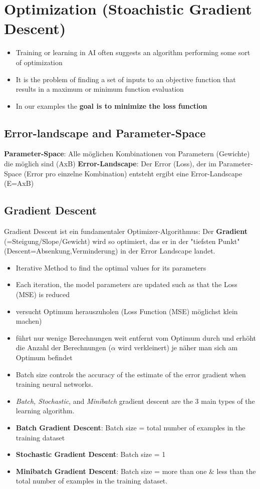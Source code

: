 \section{Optimization (Stoachistic Gradient Descent)}
\begin{itemize}
    \item Training or learning in AI often suggests an algorithm performing some sort of optimization
    \item It is the problem of finding a set of inputs to an objective function that results in a maximum or minimum function evaluation
    \item In our examples the \textbf{goal is to minimize the loss function}
\end{itemize}

\subsection{Error-landscape and Parameter-Space}
\textbf{Parameter-Space}: Alle möglichen Kombinationen von Parametern (Gewichte) die möglich sind (AxB)
\textbf{Error-Landscape}: Der Error (Loss), der im Parameter-Space (Error pro einzelne Kombination) entsteht ergibt eine Error-Landscape (E=AxB)

\subsection{Gradient Descent}
Gradient Descent ist ein fundamentaler Optimizer-Algorithmus: Der \textbf{Gradient} (=Steigung/Slope/Gewicht) wird so optimiert, das er in der "tiefsten Punkt" (Descent=Absenkung,Verminderung) in der Error Landscape landet.
\begin{itemize}
    \item Iterative Method to find the optimal values for its parameters
    \item Each iteration, the model parameters are updated such as that the Loss (MSE) is reduced
    \item versucht Optimum herauszuholen (Loss Function (MSE) möglichst klein machen)
    \item führt nur wenige Berechnungen weit entfernt vom Optimum durch und erhöht die Anzahl der Berechnungen ($\alpha$ wird verkleinert) je näher man sich am Optimum befindet
    \item Batch size controls the accuracy of the estimate of the error gradient when training neural networks.
    \item \textit{Batch, Stochastic}, and \textit{Minibatch} gradient descent are the 3 main types of the learning algorithm.
    \item \textbf{Batch Gradient Descent}: Batch size = total number of examples in the training dataset
    \item \textbf{Stochastic Gradient Descent}: Batch size = 1
    \item \textbf{Minibatch Gradient Descent}: Batch size = more than one \& less than the total number of examples in the training dataset.
\end{itemize}

